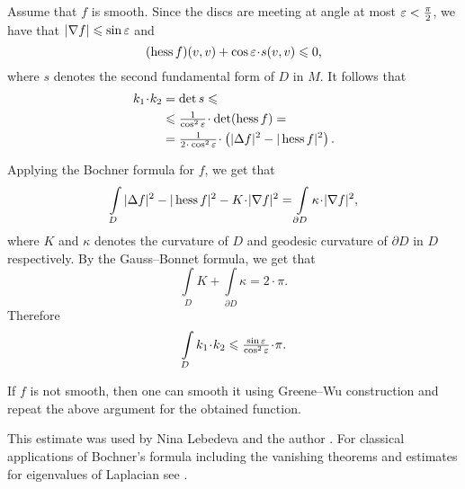 Assume that $f$ is smooth.
Since the discs are meeting at angle at most $\varepsilon<\tfrac\pi2$,
we have that $|\nabla f|\leqslant \sin\varepsilon$ and 
\[(\Hess f)(v,v)+ \cos\eps \cdot s(v,v)\le 0,\]
where $s$ denotes the second fundamental form of $D$ in $M$.
It follows that
\begin{align*}
k_1\cdot k_2&=\det s\le
\\
&\le \tfrac1{\cos^2\eps}\cdot \det(\Hess f)=
\\
&=\tfrac1{2\cdot\cos^2\eps}\cdot\left(|\Delta f|^2
-|\Hess f|^2\right).
\end{align*}


Applying the Bochner formula for $f$, we get that
\[\int\limits_D |\Delta f|^2
-|\Hess f|^2
-K\cdot|\nabla f|^2
=\int\limits_{\partial D}
\kappa\cdot|\nabla f|^2,\]
where $K$ and $\kappa$ denotes the curvature of $D$ and geodesic curvature of $\partial D$ in $D$ respectively.
By the Gauss--Bonnet formula, we get that
\[\int\limits_D 
K+\int\limits_{\partial D}\kappa=2\cdot\pi.\]
Therefore
\[\int\limits_Dk_1\cdot k_2\le \tfrac{\sin \eps}{\cos^2\eps}\cdot\pi.\]

If $f$ is not smooth, then one can smooth it using Greene--Wu construction \cite[Theorem~2]{greene-wu} and repeat the above argument for the obtained function.
\qedsf

This estimate was used by Nina Lebedeva and the author \cite{lebedeva-petrunin-curvature}.
For classical applications of Bochner's formula including the vanishing theorems and estimates for eigenvalues of Laplacian see \cite[][II \S 8 in]{lawson-michelsohn}.
